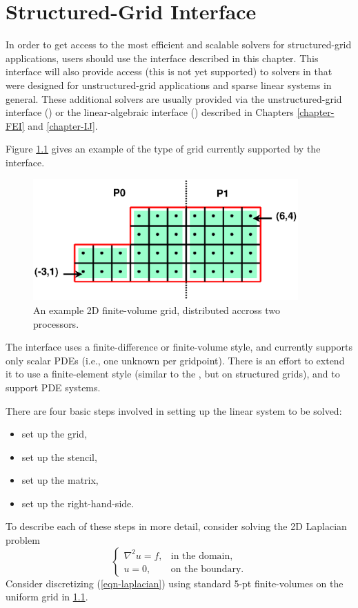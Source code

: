 \chapter{Structured-Grid Interface}
\label{Structured-Grid Interface}

In order to get access to the most efficient and scalable solvers for
structured-grid applications, users should use the 
interface described in this chapter.  This interface will also provide
access (this is not yet supported) to solvers in \hypre{} that were
designed for unstructured-grid applications and sparse linear systems
in general.  These additional solvers are usually provided via the
unstructured-grid interface () or the linear-algebraic
interface () described in Chapters \ref{chapter-FEI} and
\ref{chapter-IJ}.

Figure \ref{fig-fv-grid} gives an example of the type of grid
currently supported by the  interface.
\begin{figure}
\centering
\includegraphics[width=4in]{fv_grid.eps}
\caption{%
An example 2D finite-volume grid, distributed accross two processors.}
\label{fig-fv-grid}
\end{figure}
The interface uses a finite-difference or finite-volume style, and
currently supports only scalar PDEs (i.e., one unknown per gridpoint).
There is an effort to extend it to use a finite-element style (similar
to the , but on structured grids), and to support PDE systems.

There are four basic steps involved in setting up the linear system
to be solved:
\begin{itemize}
\item set up the grid,
\item set up the stencil,
\item set up the matrix,
\item set up the right-hand-side.
\end{itemize}
To describe each of these steps in more detail, consider solving the
2D Laplacian problem
\begin{equation}\label{eqn-laplacian}
\left \{
\begin{array}{ll}
\nabla^2 u = f , & \mbox{in the domain}, \\
u = 0,           & \mbox{on the boundary}.
\end{array}
\right .
\end{equation}
Consider discretizing (\ref{eqn-laplacian}) using standard 5-pt
finite-volumes on the uniform grid in \ref{fig-fv-grid}.

